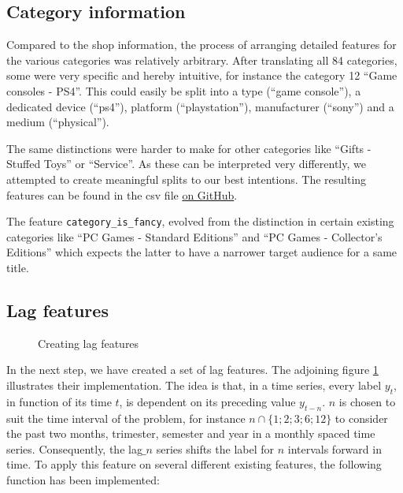 \subsection{Category information}

Compared to the shop information, the process of arranging detailed features for the various categories was relatively arbitrary. After translating all 84 categories, some were very specific and hereby intuitive, for instance the category 12 \enquote{Game consoles - PS4}. This could easily be split into a type (\enquote{game console}), a dedicated device (\enquote{ps4}), platform (\enquote{playstation}), manufacturer (\enquote{sony}) and a medium (\enquote{physical}).

The same distinctions were harder to make for other categories like \enquote{Gifts - Stuffed Toys} or \enquote{Service}. As these can be interpreted very differently, we attempted to create meaningful splits to our best intentions. The resulting features can be found in the \acrshort{csv} file \href{\repoblobbaseurl\finalCommit/data/feature_engineering/cities.csv}{on GitHub}.

The feature \texttt{category\_is\_fancy}, evolved from the distinction in certain existing categories like \enquote{PC Games - Standard Editions} and \enquote{PC Games - Collector's Editions} which expects the latter to have a narrower target audience for a same title.

\subsection{Lag features}

\begin{wrapfigure}[8]{l}{0.48\textwidth}
\centering

\captionsetup{justification=centering}
\caption{Creating lag features}
\label{lag}
\end{wrapfigure}


In the next step, we have created a set of lag features. The adjoining figure \ref{lag} illustrates their implementation. 
The idea is that, in a time series, every label $y_t$, in function of its time $t$, is dependent on its preceding value $y_{t-n}$.
$n$ is chosen to suit the time interval of the problem, for instance $n \cap \{1;2;3;6;12\}$ to consider the past two months, trimester, semester and year in a monthly spaced time series. Consequently, the lag$\_n$ series shifts the label for $n$ intervals forward in time. To apply this feature on several different existing features, the following function has been implemented:

